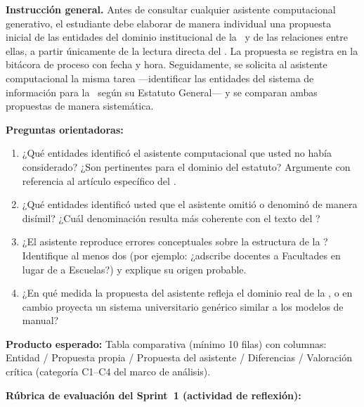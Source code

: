 \begin{tcolorbox}[actividadIA,
  title={Actividad de reflexión (Sprint~1) —
         Software generativo y diseño orientado a objetos}]

\textbf{Instrucción general.}
Antes de consultar cualquier asistente computacional generativo,
el estudiante debe elaborar de manera individual una propuesta inicial
de las entidades del dominio institucional de la \ud\ y de las relaciones
entre ellas, a partir únicamente de la lectura directa del \acuerdo.
La propuesta se registra en la bitácora de proceso con fecha y hora.
Seguidamente, se solicita al asistente computacional la misma tarea
---identificar las entidades del sistema de información para la \ud\
según su Estatuto General--- y se comparan ambas propuestas de manera
sistemática.

\bigskip
\textbf{Preguntas orientadoras:}
\begin{enumerate}[label=\arabic*.]
  \item ¿Qué entidades identificó el asistente computacional que usted
        no había considerado? ¿Son pertinentes para el dominio del estatuto?
        Argumente con referencia al artículo específico del \acuerdo.
  \item ¿Qué entidades identificó usted que el asistente omitió o
        denominó de manera disímil? ¿Cuál denominación resulta más
        coherente con el texto del \acuerdo?
  \item ¿El asistente reproduce errores conceptuales sobre la estructura
        de la \ud? Identifique al menos dos (por ejemplo: ¿adscribe
        docentes a Facultades en lugar de a Escuelas?) y explique su
        origen probable.
  \item ¿En qué medida la propuesta del asistente refleja el dominio
        real de la \ud, o en cambio proyecta un sistema universitario
        genérico similar a los modelos de manual?
\end{enumerate}

\bigskip
\textbf{Producto esperado:} Tabla comparativa (mínimo 10 filas) con
columnas: Entidad / Propuesta propia / Propuesta del asistente /
Diferencias / Valoración crítica (categoría C1--C4 del marco de análisis).

\bigskip
\textbf{Rúbrica de evaluación del Sprint~1 (actividad de reflexión):}


\end{tcolorbox}
